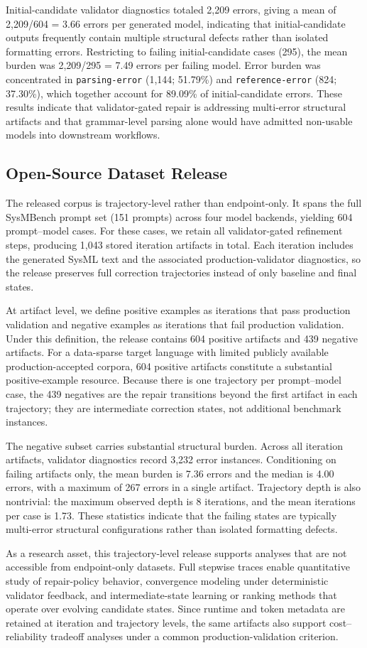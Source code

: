 Initial-candidate validator diagnostics totaled 2,209 errors, giving a mean of 2,209/604 = 3.66 errors per generated model, indicating that initial-candidate outputs frequently contain multiple structural defects rather than isolated formatting errors. Restricting to failing initial-candidate cases (295), the mean burden was 2,209/295 = 7.49 errors per failing model. Error burden was concentrated in \texttt{parsing-error} (1,144; 51.79\%) and \texttt{reference-error} (824; 37.30\%), which together account for 89.09\% of initial-candidate errors. These results indicate that validator-gated repair is addressing multi-error structural artifacts and that grammar-level parsing alone would have admitted non-usable models into downstream workflows.

\subsection{Open-Source Dataset Release}
The released corpus is trajectory-level rather than endpoint-only. It spans the full SysMBench prompt set (151 prompts) across four model backends, yielding 604 prompt--model cases. For these cases, we retain all validator-gated refinement steps, producing 1,043 stored iteration artifacts in total. Each iteration includes the generated SysML text and the associated production-validator diagnostics, so the release preserves full correction trajectories instead of only baseline and final states.

At artifact level, we define positive examples as iterations that pass production validation and negative examples as iterations that fail production validation. Under this definition, the release contains 604 positive artifacts and 439 negative artifacts. For a data-sparse target language with limited publicly available production-accepted corpora, 604 positive artifacts constitute a substantial positive-example resource. Because there is one trajectory per prompt--model case, the 439 negatives are the repair transitions beyond the first artifact in each trajectory; they are intermediate correction states, not additional benchmark instances.

The negative subset carries substantial structural burden. Across all iteration artifacts, validator diagnostics record 3,232 error instances. Conditioning on failing artifacts only, the mean burden is 7.36 errors and the median is 4.00 errors, with a maximum of 267 errors in a single artifact. Trajectory depth is also nontrivial: the maximum observed depth is 8 iterations, and the mean iterations per case is 1.73. These statistics indicate that the failing states are typically multi-error structural configurations rather than isolated formatting defects.

As a research asset, this trajectory-level release supports analyses that are not accessible from endpoint-only datasets. Full stepwise traces enable quantitative study of repair-policy behavior, convergence modeling under deterministic validator feedback, and intermediate-state learning or ranking methods that operate over evolving candidate states. Since runtime and token metadata are retained at iteration and trajectory levels, the same artifacts also support cost--reliability tradeoff analyses under a common production-validation criterion.
